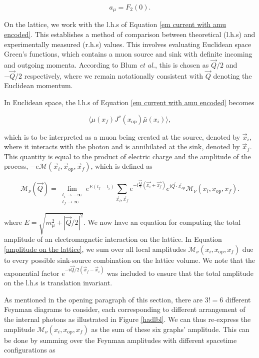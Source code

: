 \documentclass{article}
\numberwithin{equation}{section} %
\begin{document}
\begin{equation}
a_\mu = F_2(0).
\end{equation}

On the lattice, we work with the l.h.s of Equation \ref{em current with amu encoded}. This establishes a method of comparison between theoretical (l.h.s) and experimentally measured (r.h.s) values. This involves evaluating Euclidean space Green's functions, which contains a muon source and sink with definite incoming and outgoing momenta. According to Blum \textit{et al.}\cite{blum}, this is chosen as $\vec{Q}/2$ and $-\vec{Q}/2$ respectively, where we remain notationally consistent with $\vec{Q}$ denoting the Euclidean momentum. 

In Euclidean space, the l.h.s of Equation \ref{em current with amu encoded} becomes

\begin{equation}
\langle \mu(x_f) J^\nu(x_\mathrm{op}) \bar{\mu}(x_i)\rangle,
\end{equation}

\noindent which is to be interpreted as a muon being created at the source, denoted by $\vec{x}_i$, where it interacts with the photon and is annihilated at the sink, denoted by $\vec{x}_f$. This quantity is equal to the product of electric charge and the amplitude of the process, $-e\mathcal{M}(\vec{x}_i,\vec{x}_\mathrm{op},\vec{x}_f)$, which is defined as

\begin{equation}
\mathcal{M}_\nu(\vec{Q}) = \lim_{\substack{t_i\rightarrow -\infty\\t_f \rightarrow \infty}} e^{E(t_f-t_i)} \sum_{\vec{x}_i,\vec{x}_f}e^{-i\frac{\vec{Q}}{2}(\vec{x_i}+\vec{x_f})}e^{i\vec{Q}\cdot\vec{x}_{op}} \mathcal{M}_\nu(x_i,x_\mathrm{op}, x_f).
\label{amplitude on the lattice}
\end{equation}

\noindent where $E=\sqrt{m_\mu^2+|\vec{Q}/2|^2}$. We now have an equation for computing the total amplitude of an electromagnetic interaction on the lattice. In Equation \ref{amplitude on the lattice}, we sum over all local amplitudes $\mathcal{M}_\nu(x_i,x_{\mathrm{op}},x_f)$ due to every possible sink-source combination on the lattice volume. We note that the exponential factor $e^{-i\vec{Q}/2(\vec{x}_f-\vec{x}_i)}$ was included to ensure that the total amplitude on the l.h.s is translation invariant. 

As mentioned in the opening paragraph of this section, there are $3!=6$ different Feynman diagrams to consider, each corresponding to different arrangement of the internal photons as illustrated in Figure \ref{hadlbl}. We can thus re-express the amplitude $\mathcal{M}_\nu(x_i,x_\mathrm{op},x_f)$ as the sum of these six graphs' amplitude. This can be done by summing over the Feynman amplitudes with different spacetime configurations as
\end{document}
